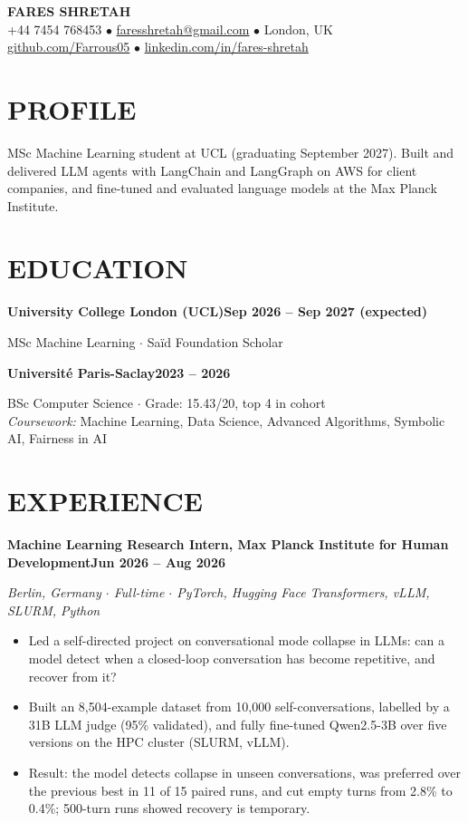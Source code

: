 \documentclass[10pt, a4paper]{article}
\newcommand{\entry}[2]{\vspace{5pt}\textbf{#1}\hfill\textbf{#2}\par}
\newcommand{\sub}[1]{\textit{#1}\par}
\begin{document}
\begin{center}
    {\huge \textbf{FARES SHRETAH}} \\[3pt]
    \small +44 7454 768453 $\bullet$ \href{mailto:faresshretah@gmail.com}{faresshretah@gmail.com} $\bullet$ London, UK \\
    \small \href{https://github.com/Farrous05}{github.com/Farrous05} $\bullet$ \href{https://www.linkedin.com/in/fares-shretah/}{linkedin.com/in/fares-shretah}
\end{center}

\section*{PROFILE}
MSc Machine Learning student at UCL (graduating September 2027). Built and delivered LLM agents with LangChain and LangGraph on AWS for client companies, and fine-tuned and evaluated language models at the Max Planck Institute.

\section*{EDUCATION}
\entry{University College London (UCL)}{Sep 2026 -- Sep 2027 (expected)}
MSc Machine Learning $\cdot$ Sa\"id Foundation Scholar

\entry{Universit\'e Paris-Saclay}{2023 -- 2026}
BSc Computer Science $\cdot$ Grade: 15.43/20, top 4 in cohort \\
\textit{Coursework:} Machine Learning, Data Science, Advanced Algorithms, Symbolic AI, Fairness in AI

\section*{EXPERIENCE}
\entry{Machine Learning Research Intern, Max Planck Institute for Human Development}{Jun 2026 -- Aug 2026}
\sub{Berlin, Germany $\cdot$ Full-time $\cdot$ PyTorch, Hugging Face Transformers, vLLM, SLURM, Python}
\begin{itemize}
    \item Led a self-directed project on conversational mode collapse in LLMs: can a model detect when a closed-loop conversation has become repetitive, and recover from it?
    \item Built an 8,504-example dataset from 10,000 self-conversations, labelled by a 31B LLM judge (95\% validated), and fully fine-tuned Qwen2.5-3B over five versions on the HPC cluster (SLURM, vLLM).
    \item Result: the model detects collapse in unseen conversations, was preferred over the previous best in 11 of 15 paired runs, and cut empty turns from 2.8\% to 0.4\%; 500-turn runs showed recovery is temporary.
\end{itemize}
\end{document}
